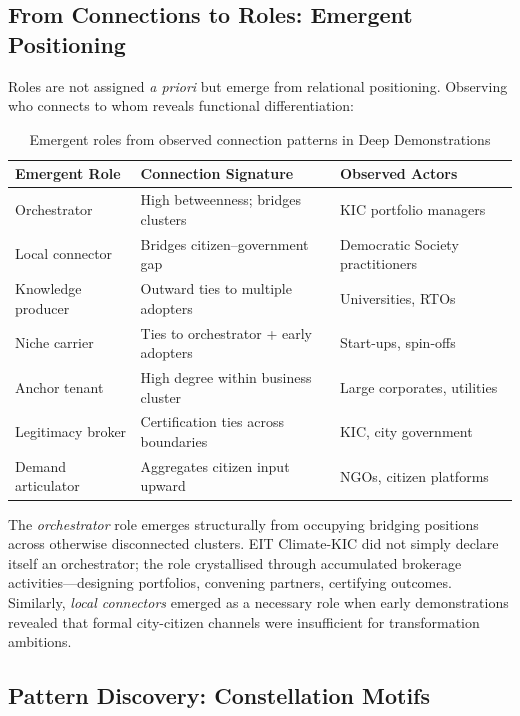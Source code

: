 \subsection{From Connections to Roles: Emergent Positioning}

Roles are not assigned \textit{a priori} but emerge from relational positioning. Observing who connects to whom reveals functional differentiation:

\begin{table}[htbp]
\centering\small
\caption{Emergent roles from observed connection patterns in Deep Demonstrations}
\label{tab:emergent-roles}
\begin{tabular}{@{}p{2.5cm}p{4.2cm}p{4.8cm}@{}}
\toprule
\textbf{Emergent Role} & \textbf{Connection Signature} & \textbf{Observed Actors} \\
\midrule
Orchestrator & High betweenness; bridges clusters & KIC portfolio managers \\
Local connector & Bridges citizen--government gap & Democratic Society practitioners \\
Knowledge producer & Outward ties to multiple adopters & Universities, RTOs \\
Niche carrier & Ties to orchestrator + early adopters & Start-ups, spin-offs \\
Anchor tenant & High degree within business cluster & Large corporates, utilities \\
Legitimacy broker & Certification ties across boundaries & KIC, city government \\
Demand articulator & Aggregates citizen input upward & NGOs, citizen platforms \\
\bottomrule
\end{tabular}
\end{table}

The \textit{orchestrator} role emerges structurally from occupying bridging positions across otherwise disconnected clusters. EIT Climate-KIC did not simply declare itself an orchestrator; the role crystallised through accumulated brokerage activities---designing portfolios, convening partners, certifying outcomes. Similarly, \textit{local connectors} emerged as a necessary role when early demonstrations revealed that formal city-citizen channels were insufficient for transformation ambitions.

\subsection{Pattern Discovery: Constellation Motifs}

